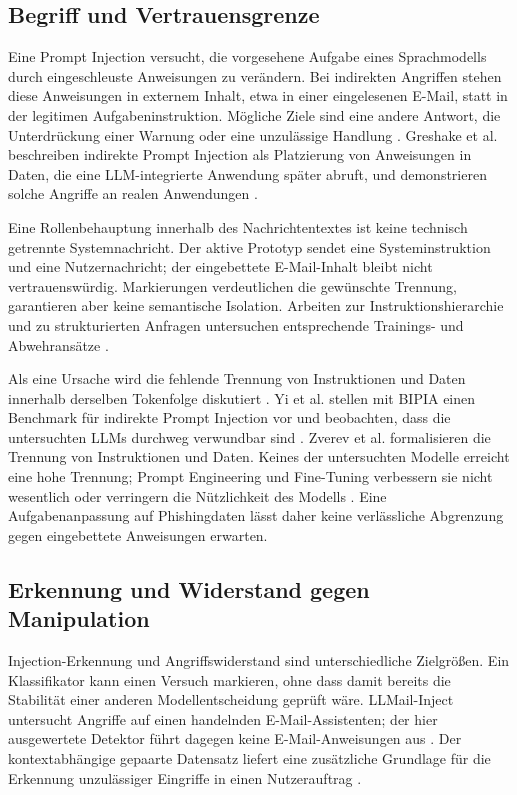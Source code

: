 \documentclass[12pt,twoside=false,a4paper,parskip]{scrbook}
\begin{document}
\subsection{Begriff und Vertrauensgrenze}\label{sec:injection-mechanismus}

Eine Prompt Injection versucht, die vorgesehene Aufgabe eines Sprachmodells durch eingeschleuste Anweisungen zu verändern. Bei indirekten Angriffen stehen diese Anweisungen in externem Inhalt, etwa in einer eingelesenen E-Mail, statt in der legitimen Aufgabeninstruktion. Mögliche Ziele sind eine andere Antwort, die Unterdrückung einer Warnung oder eine unzulässige Handlung \cite{perez2022ignore,liu2024formalizing}. Greshake et al. beschreiben indirekte Prompt Injection als Platzierung von Anweisungen in Daten, die eine LLM-integrierte Anwendung später abruft, und demonstrieren solche Angriffe an realen Anwendungen \cite{greshake2023indirect}.

Eine Rollenbehauptung innerhalb des Nachrichtentextes ist keine technisch getrennte Systemnachricht. Der aktive Prototyp sendet eine Systeminstruktion und eine Nutzernachricht; der eingebettete E-Mail-Inhalt bleibt nicht vertrauenswürdig. Markierungen verdeutlichen die gewünschte Trennung, garantieren aber keine semantische Isolation. Arbeiten zur Instruktionshierarchie und zu strukturierten Anfragen untersuchen entsprechende Trainings- und Abwehransätze \cite{wallace2024hierarchy,chen2025struq}.

Als eine Ursache wird die fehlende Trennung von Instruktionen und Daten innerhalb derselben Tokenfolge diskutiert \cite{yi2023benchmarking,zverev2025separate}. Yi et al. stellen mit BIPIA einen Benchmark für indirekte Prompt Injection vor und beobachten, dass die untersuchten LLMs durchweg verwundbar sind \cite{yi2023benchmarking}. Zverev et al. formalisieren die Trennung von Instruktionen und Daten. Keines der untersuchten Modelle erreicht eine hohe Trennung; Prompt Engineering und Fine-Tuning verbessern sie nicht wesentlich oder verringern die Nützlichkeit des Modells \cite{zverev2025separate}. Eine Aufgabenanpassung auf Phishingdaten lässt daher keine verlässliche Abgrenzung gegen eingebettete Anweisungen erwarten.

\subsection{Erkennung und Widerstand gegen Manipulation}

Injection-Erkennung und Angriffswiderstand sind unterschiedliche Zielgrößen. Ein Klassifikator kann einen Versuch markieren, ohne dass damit bereits die Stabilität einer anderen Modellentscheidung geprüft wäre. LLMail-Inject untersucht Angriffe auf einen handelnden E-Mail-Assistenten; der hier ausgewertete Detektor führt dagegen keine E-Mail-Anweisungen aus \cite{abdelnabi2025llmail}. Der kontextabhängige gepaarte Datensatz liefert eine zusätzliche Grundlage für die Erkennung unzulässiger Eingriffe in einen Nutzerauftrag \cite{abdelnabi2026agents}.
\end{document}
